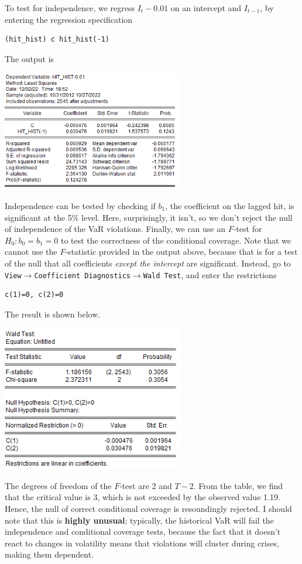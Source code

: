 \documentclass[11pt, a4paper]{article}
\begin{document}
\begin{enumerate}
To test for independence, we regress $I_t-0.01$ on an intercept and $I_{t-1}$, by entering the regression specification
\begin{verbatim}
(hit_hist) c hit_hist(-1)
\end{verbatim}
The output is
\begin{center}
\includegraphics[width=0.6\textwidth]{hit2}
\end{center}
Independence can be tested by checking if $b_1$, the coefficient on the lagged hit, is significant at the 5\% level. Here, surprisingly, it isn't, so we don't reject the null of independence of the VaR violations. Finally, we can use an $F$-test for $H_0:b_0=b_1=0$ to test the correctness of the conditional coverage. Note that we cannot use the $F$-statistic provided in the output above, because that is for a test of the null that all coefficients \emph{except the intercept} are significant. Instead, go to \texttt{View$\rightarrow$Coefficient Diagnostics$\rightarrow$Wald Test}, and enter the restrictions
\begin{verbatim}
c(1)=0, c(2)=0
\end{verbatim}
The result is shown below.
\begin{center}
\includegraphics[width=0.6\textwidth]{wald}
\end{center}
The degrees of freedom of the $F$-test are 2 and $T-2$. From the table, we find that the critical value is 3, which is not exceeded by the observed value 1.19. Hence, the null of correct conditional coverage is resoundingly rejected. I should note that this is \textbf{highly unusual}; typically, the historical VaR will fail the independence and conditional coverage tests, because the fact that it doesn't react to changes in volatility means that violations will cluster during crises, making them dependent.


\end{enumerate}
\end{document}
